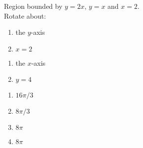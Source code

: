 {Region bounded by $y=2x$, $y=x$ and $x=2$.\\
Rotate about:\\
\begin{minipage}[t]{.5\linewidth}
\begin{enumerate}
\item		the $y$-axis
\item		$x=2$
\end{enumerate}
\end{minipage}%
\begin{minipage}[t]{.5\linewidth}
\begin{enumerate}\addtocounter{enumii}{2}
\item		the $x$-axis
\item		$y=4$
\end{enumerate}
\end{minipage}
}
{\begin{enumerate}
\item $16\pi/3$
\item $8\pi/3$
\item $8\pi$
\item $8\pi$
\end{enumerate}
}
